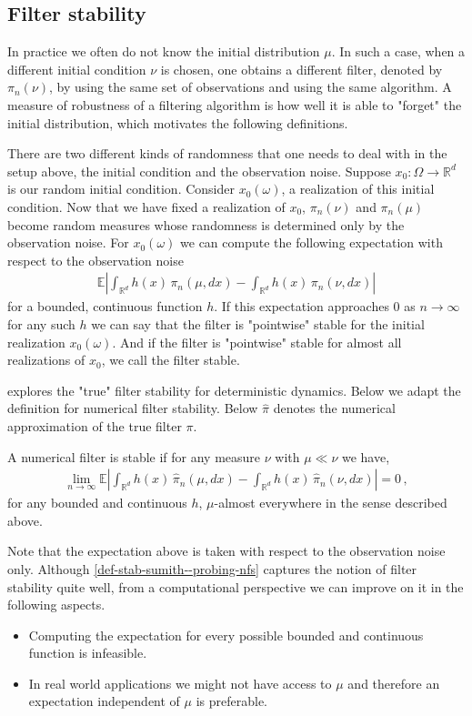 \subsection{Filter stability}\label{ssec-def-stab--probing-nfs} 
In practice we often do not know the initial distribution $\mu$. In such a case, when a different initial condition $\nu$ is chosen, one obtains a different filter, denoted by $\pi_{n}(\nu)$, by using the same set of observations and using the same algorithm. A measure of robustness of a filtering algorithm is how well it is able to "forget" the initial distribution, which motivates the following definitions.
{\color{mypink}

There are two different kinds of randomness that one needs to deal with in the setup above, the initial condition and the observation noise. Suppose $x_0:\Omega \to\mathbb R^d$ is our random initial condition. Consider $x_0(\omega)$, a realization of this initial condition. Now that we have fixed a realization of $x_0$, $\pi_n(\nu)$ and $\pi_n(\mu)$ become random measures whose randomness is determined only by the observation noise. For $x_0(\omega)$ we can compute the following expectation with respect to the observation noise 
\begin{align}
    \mathbb E \left|\int_{\mathbb R^d}  h(x)\, {{\pi_n(\mu, dx)}} - \int_{\mathbb R^d}  h(x)\, {{\pi_n(\nu, dx)}}\right|
\end{align}
for a bounded, continuous function $h$. If this expectation approaches $0$ as $n\to\infty$ for any such $h$ we can say that the filter is "pointwise" stable for the initial realization $x_0(\omega)$. And if the filter is "pointwise" stable for almost all realizations of $x_0$, we call the filter stable.  

\cite{reddy2021stability} explores the "true" filter stability for deterministic dynamics. Below we adapt the definition for numerical filter stability. Below $\hat\pi$ denotes the numerical approximation of the true filter $\pi$.
\begin{defn} A numerical filter is stable if  for any
measure $\nu$ with $\mu\ll\nu$ we have, 
\begin{align}
    \lim_{n\to\infty}\mathbb E \left|\int_{\mathbb R^d}  h(x)\, {{\hat\pi_n(\mu, dx)}} - \int_{\mathbb R^d}  h(x)\, {{\hat\pi_n(\nu, dx)}}\right|\label{def-stab-sumith--probing-nfs} = 0 \,,
\end{align}
for any bounded and continuous $h$, $\mu$-almost everywhere in the sense described above.
\label{def-stab-ra--probing-nfs} \end{defn}
Note that the expectation above is taken with respect to the observation noise only. Although \eqref{def-stab-sumith--probing-nfs} captures the notion of filter stability quite well, from a computational perspective we can improve on it in the following aspects. 
\begin{itemize}
 \item Computing the expectation for every possible bounded and continuous function is infeasible.
\item In real world applications we might not have access to $\mu$ and therefore an expectation independent of $\mu$ is preferable.


\end{itemize}}
